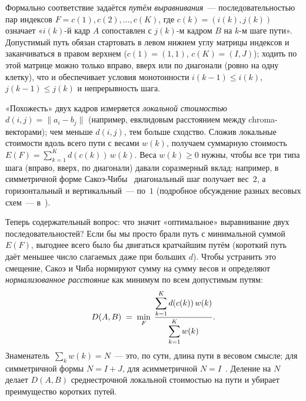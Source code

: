 Формально соответствие задаётся \textit{путём выравнивания}~---
последовательностью пар индексов $F = c(1), c(2), \dots, c(K)$,
где $c(k) = (i(k), j(k))$ означает «$i(k)$-й кадр $A$
сопоставлен с $j(k)$-м кадром $B$ на $k$-м шаге пути».
Допустимый путь обязан стартовать в левом нижнем углу матрицы
индексов и заканчиваться в правом верхнем
($c(1) = (1, 1)$, $c(K) = (I, J)$); ходить по этой матрице можно
только вправо, вверх или по диагонали (ровно на одну клетку),
что и обеспечивает условия монотонности
$i(k-1) \le i(k)$, $j(k-1) \le j(k)$ и непрерывность шага.

«Похожесть» двух кадров измеряется \textit{локальной стоимостью}
$d(i, j) = \|a_i - b_j\|$ (например, евклидовым расстоянием
между chroma-векторами); чем меньше $d(i, j)$, тем больше
сходство. Сложив локальные стоимости вдоль всего пути с
весами $w(k)$, получаем суммарную стоимость
$E(F) = \sum_{k=1}^K d(c(k))\,w(k)$. Веса $w(k) \ge 0$ нужны,
чтобы все три типа шага (вправо, вверх, по диагонали)
давали соразмерный вклад: например, в симметричной форме
Сакоэ-Чибы~\cite[уравн.~12]{SakoeChiba1978} диагональный шаг
получает вес~$2$, а горизонтальный и вертикальный~--- по~$1$
(подробное обсуждение разных весовых схем~---
в~\cite[\S~II-B]{SakoeChiba1978}).

Теперь содержательный вопрос: что значит «оптимальное»
выравнивание двух последовательностей? Если бы мы просто брали
путь с минимальной суммой $E(F)$, выгоднее всего было бы
двигаться кратчайшим путём (короткий путь даёт меньшее число
слагаемых даже при больших $d$). Чтобы устранить это
смещение, Сакоэ и Чиба нормируют сумму на сумму весов и
определяют \textit{нормализованное расстояние} как минимум
по всем допустимым путям:
\begin{equation}
D(A, B) \;=\; \min_{F}\;
\dfrac{\displaystyle\sum_{k=1}^{K} d(c(k))\,w(k)}
      {\displaystyle\sum_{k=1}^{K} w(k)}.
\eqlab{dtw-norm}
\end{equation}
Знаменатель~$\sum_k w(k) = N$~--- это, по сути, длина пути в
весовом смысле; для симметричной формы $N = I + J$, для
асимметричной $N = I$~\cite[уравн.~13--15]{SakoeChiba1978}.
Деление на $N$ делает $D(A, B)$ среднестрочной локальной
стоимостью на пути и убирает преимущество коротких путей.

